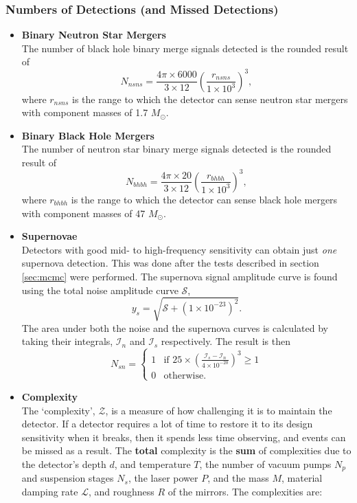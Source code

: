 \documentclass{article}
\begin{document}
\subsubsection{Numbers of Detections (and Missed Detections)}
\begin{itemize}
\item\textbf{Binary Neutron Star Mergers}\\
    The number of black hole binary merge signals detected is the rounded result of
    \[
    N_{nsns} = \frac{4\pi\times6000}{3 \times 12}\left(\frac{r_{nsns}}{1 \times 10^3}\right)^3 ,
    \]
    where $r_{nsns}$ is the range to which the detector can sense neutron star mergers with component masses of 1.7 $M_{\odot}$.
\item\textbf{Binary Black Hole Mergers}\\
    The number of neutron star binary merge signals detected is the rounded result of
    \[
    N_{bhbh} = \frac{4\pi\times20}{3 \times 12}\left(\frac{r_{bhbh}}{1 \times 10^3}\right)^3 ,
    \]
    where $r_{bhbh}$ is the range to which the detector can sense black hole mergers with component masses of 47 $M_{\odot}$.
\item\textbf{Supernovae}\\
    Detectors with good mid- to high-frequency sensitivity can obtain just \textit{one} supernova detection. This was done after the tests described in section \ref{sec:mcmc} were performed. The supernova signal amplitude curve is found using the total noise amplitude curve $\mathcal{S}$,
    \[
    y_s = \sqrt{\mathcal{S} + (1 \times 10^{-23})^2}.
    \]
    The area under both the noise and the supernova curves is calculated by taking their integrals, $\mathcal{I}_n$ and $\mathcal{I}_s$ respectively. The result is then
    \[
    N_{sn} = \begin{cases}
             1 & \text{if $25 \times \left(\frac{\mathcal{I}_s - \mathcal{I}_n}{4 \times 10^{-20}}\right)^3 \geq 1$} \\
             0 & \text{otherwise}.
             \end{cases}
    \]
\item\textbf{Complexity}\\
The `complexity', $\mathcal{Z}$, is a measure of how challenging it is to maintain the detector. If a detector requires a lot of time to restore it to its design sensitivity when it breaks, then it spends less time observing, and events can be missed as a result. The \textbf{total} complexity is the \textbf{sum} of complexities due to the detector's depth $d$, and temperature $T$, the number of vacuum pumps $N_p$ and suspension stages $N_s$, the laser power $P$, and the mass $M$, material damping rate $\mathcal{L}$, and roughness $R$ of the mirrors. The complexities are:
        

\end{itemize}
\end{document}
